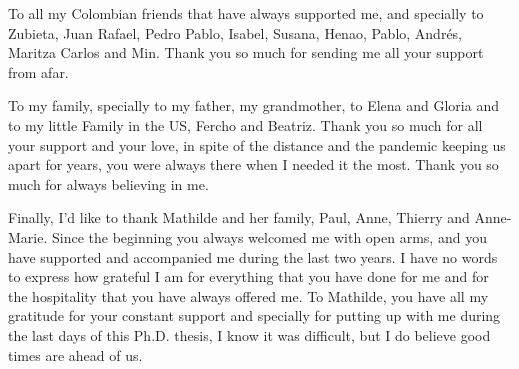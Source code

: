 To all my Colombian friends that have always supported me, and specially to Zubieta, Juan Rafael, Pedro Pablo, Isabel, Susana, Henao, Pablo, Andrés, Maritza Carlos and Min. Thank you so much for sending me all your support from afar.

To my family, specially to my father, my grandmother, to Elena and Gloria and to my little Family in the US, Fercho and Beatriz. Thank you so much for all your support and your love, in spite of the distance and the pandemic keeping us apart for years, you were always there when I needed it the most. Thank you so much for always believing in me.

Finally, I'd like to thank Mathilde and her family, Paul, Anne, Thierry and Anne-Marie. Since the beginning you always welcomed me with open arms, and you have supported and accompanied me during the last two years. I have no words to express how grateful I am for everything that you have done for me and for the hospitality that you have always offered me. To Mathilde, you have all my gratitude for your constant support and specially for putting up with me during the last days of this Ph.D. thesis, I know it was difficult, but I do believe good times are ahead of us.
